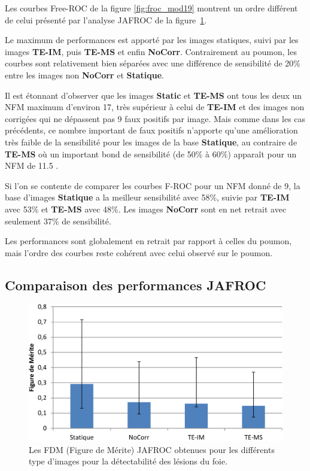 Les courbes Free-ROC de la figure \ref{fig:froc_mod19} montrent un ordre différent de celui présenté par l'analyse JAFROC de la figure~\ref{fig:fom_mod19}.

Le maximum de performances est apporté par les images statiques, suivi par les images \textbf{TE-IM}, puis \textbf{TE-MS} et enfin \textbf{NoCorr}. Contrairement au poumon, les courbes sont relativement bien séparées avec une différence de sensibilité de 20\% entre les images non \textbf{NoCorr} et \textbf{Statique}. 

Il est étonnant d'observer que les images \textbf{Static} et \textbf{TE-MS} ont tous les deux un NFM maximum d'environ 17, très supérieur à celui de \textbf{TE-IM} et des images non corrigées qui ne dépassent pas 9 faux positifs par image. Mais comme dans les cas précédents, ce nombre important de faux positifs n'apporte qu'une amélioration très faible de la sensibilité pour les images de la base \textbf{Statique}, au contraire de \textbf{TE-MS} où un important bond de sensibilité (de 50\% à 60\%) apparaît pour un NFM de 11.5 . 

Si l'on se contente de comparer les courbes F-ROC pour un NFM donné de 9, la base d'images \textbf{Statique} a la meilleur sensibilité avec 58\%, suivie par \textbf{TE-IM} avec 53\% et \textbf{TE-MS} avec 48\%. Les images \textbf{NoCorr} sont en net retrait avec seulement 37\% de sensibilité.

Les performances sont globalement en retrait par rapport à celles du poumon, mais l'ordre des courbes reste cohérent avec celui observé sur le poumon.


\subsection{Comparaison des performances JAFROC}

\begin{figure}[h!]
 \begin{center}
   \includegraphics[width=15cm]{images/FOM_mod19}
 \end{center}
 \caption{Les FDM (Figure de Mérite) JAFROC obtenues pour les différents type d'images pour la détectabilité des lésions du foie.}
 \label{fig:fom_mod19} 
\end{figure}


